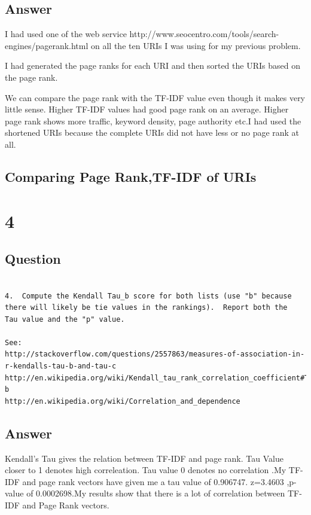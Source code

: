 \documentclass[letterpaper,11pt]{article}
\begin{document}
\newpage
\subsection*{Answer}
I had used one of the web service http://www.seocentro.com/tools/search-engines/pagerank.html on all the ten URIs I was using for my previous problem. 


I had generated the page ranks for each URI and then sorted the URIs based on the page rank. 
 
 
 We can compare the page rank with the TF-IDF value even though it makes very little sense. Higher TF-IDF values had good page rank on an average. Higher page rank shows more traffic, keyword density, page authority  etc.I had used the shortened URIs because the complete URIs did not have less or no page rank at all.
 
\subsection*{Comparing Page Rank,TF-IDF of URIs } 





\newpage

\section*{4}

\subsection*{Question}


\begin{verbatim}

4.  Compute the Kendall Tau_b score for both lists (use "b" because
there will likely be tie values in the rankings).  Report both the
Tau value and the "p" value.

See: 
http://stackoverflow.com/questions/2557863/measures-of-association-in-r-kendalls-tau-b-and-tau-c
http://en.wikipedia.org/wiki/Kendall_tau_rank_correlation_coefficient#Tau-b
http://en.wikipedia.org/wiki/Correlation_and_dependence
\end{verbatim}

\subsection*{Answer}
Kendall's Tau  gives the relation between TF-IDF and page rank. Tau Value closer to 1 denotes high correleation. Tau value 0 denotes no correlation .My TF-IDF and page rank vectors have given me a tau value of 0.906747. z=3.4603 ,p-value of 0.0002698.My results show that there is a lot of correlation between TF-IDF and Page Rank vectors.
\newpage
\end{document}
